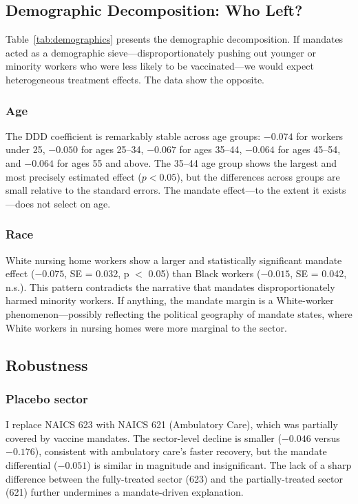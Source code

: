 \documentclass[12pt]{article}
\begin{document}
\subsection{Demographic Decomposition: Who Left?}

Table~\ref{tab:demographics} presents the demographic decomposition. If mandates acted as a demographic sieve---disproportionately pushing out younger or minority workers who were less likely to be vaccinated---we would expect heterogeneous treatment effects. The data show the opposite.

\subsubsection*{Age} The DDD coefficient is remarkably stable across age groups: $-0.074$ for workers under 25, $-0.050$ for ages 25--34, $-0.067$ for ages 35--44, $-0.064$ for ages 45--54, and $-0.064$ for ages 55 and above. The 35--44 age group shows the largest and most precisely estimated effect ($p < 0.05$), but the differences across groups are small relative to the standard errors. The mandate effect---to the extent it exists---does not select on age.

\subsubsection*{Race} White nursing home workers show a larger and statistically significant mandate effect ($-0.075$, SE = 0.032, p $<$ 0.05) than Black workers ($-0.015$, SE = 0.042, n.s.). This pattern contradicts the narrative that mandates disproportionately harmed minority workers. If anything, the mandate margin is a White-worker phenomenon---possibly reflecting the political geography of mandate states, where White workers in nursing homes were more marginal to the sector.



\subsection{Robustness}

\subsubsection*{Placebo sector} I replace NAICS 623 with NAICS 621 (Ambulatory Care), which was partially covered by vaccine mandates. The sector-level decline is smaller ($-0.046$ versus $-0.176$), consistent with ambulatory care's faster recovery, but the mandate differential ($-0.051$) is similar in magnitude and insignificant. The lack of a sharp difference between the fully-treated sector (623) and the partially-treated sector (621) further undermines a mandate-driven explanation.
\end{document}
